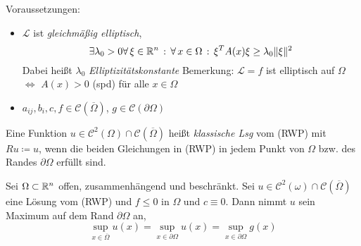 \documentclass{cheat-sheet}
\newcommand{\Cont}{\mathcal{C}} %
\newcommand{\clos}[1]{\overline{#1}} %
\begin{document}

Voraussetzungen:

\begin{itemize}
  \item $\mathcal{L}$ ist \emph{gleichmäßig elliptisch}, \dh{}
  \[ \exists{\lambda_0 > 0} \forall \, {\xi \in \mathbb{R}^n} \,:\, \forall \, {x \in \Omega} \,:\, \xi^T A(x) \xi \geq \lambda_0 \lVert\xi\rVert^2 \]
  Dabei heißt $\lambda_0$ \emph{Elliptizitätskonstante}
  Bemerkung: $\mathcal{L} = f$ ist elliptisch auf $\Omega$ $\iff$ $A(x) > 0$ (spd) für alle $x \in \Omega$
  \item $a_{ij}, b_i, c, f \in \Cont(\clos{\Omega})$, $g \in \Cont(\partial \Omega)$
\end{itemize}

\begin{defn}
  Eine Funktion $u \in \Cont^2(\Omega) \cap \Cont(\clos{\Omega})$ heißt \emph{klassische Lsg} vom (RWP) mit $Ru \coloneqq u$, wenn die beiden Gleichungen in (RWP) in jedem Punkt von $\Omega$ bzw. des Randes $\partial \Omega$ erfüllt sind.
\end{defn}

\begin{satz}[Maximumsprinzip]
  Sei $\Omega \subset \mathbb{R}^n$ offen, zusammenhängend und beschränkt.
  Sei $u \in \Cont^2(\omega) \cap \Cont(\clos{\Omega})$ eine Lösung vom (RWP) und $f \leq 0$ in $\Omega$ und $c \equiv 0$. Dann nimmt $u$ sein Maximum auf dem Rand $\partial \Omega$ an, \dh{}
  \[ \sup_{x \in \clos{\Omega}} u(x) = \sup_{x \in \partial \Omega} u(x) = \sup_{x \in \partial \Omega} g(x) \]
\end{satz}
\end{document}
